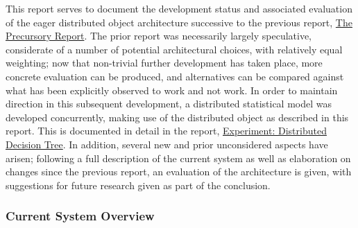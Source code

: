This report serves to document the development status and associated
evaluation of the eager distributed object architecture successive to
the previous report, \href{experiment-eager-dist-obj-pre.html}{The
Precursory Report}. The prior report was necessarily largely
speculative, considerate of a number of potential architectural choices,
with relatively equal weighting; now that non-trivial further
development has taken place, more concrete evaluation can be produced,
and alternatives can be compared against what has been explicitly
observed to work and not work. In order to maintain direction in this
subsequent development, a distributed statistical model was developed
concurrently, making use of the distributed object as described in this
report. This is documented in detail in the report,
\href{experiment-dist-decision-tree.html}{Experiment: Distributed
Decision Tree}. In addition, several new and prior unconsidered aspects
have arisen; following a full description of the current system as well
as elaboration on changes since the previous report, an evaluation of
the architecture is given, with suggestions for future research given as
part of the conclusion.

\hypertarget{sec:overview}{%
\subsubsection{Current System Overview}\label{sec:overview}}

